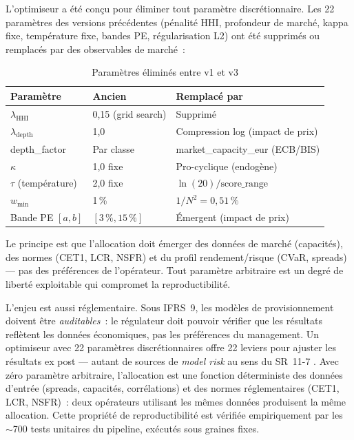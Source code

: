 \documentclass[10pt, a4paper, oneside]{report}
\theoremstyle{definition}
\begin{document}
L'optimiseur a été conçu pour éliminer tout paramètre discrétionnaire. Les 22 paramètres des versions précédentes (pénalité HHI, profondeur de marché, kappa fixe, température fixe, bandes PE, régularisation L2) ont été supprimés ou remplacés par des observables de marché~:

\begin{table}[htbp]
\centering
\caption{Paramètres éliminés entre v1 et v3}
\label{tab:zero-params}
\small
\begin{tabular}{lll}
\toprule
Paramètre & Ancien & Remplacé par \\
\midrule
$\lambda_{\text{HHI}}$ & 0{,}15 (grid search) & Supprimé \\
$\lambda_{\text{depth}}$ & 1{,}0 & Compression log (impact de prix) \\
depth\_factor & Par classe & market\_capacity\_eur (ECB/BIS) \\
$\kappa$ & 1{,}0 fixe & Pro-cyclique (endogène) \\
$\tau$ (température) & 2{,}0 fixe & $\ln(20) / \text{score\_range}$ \\
$w_{\min}$ & 1\,\% & $1/N^2 = 0{,}51\,\%$ \\
Bande PE $[a, b]$ & $[3\,\%, 15\,\%]$ & Émergent (impact de prix) \\
\bottomrule
\end{tabular}
\end{table}

Le principe est que l'allocation doit émerger des données de marché (capacités), des normes (CET1, LCR, NSFR) et du profil rendement/risque (CVaR, spreads) --- pas des préférences de l'opérateur. Tout paramètre arbitraire est un degré de liberté exploitable qui compromet la reproductibilité.

L'enjeu est aussi réglementaire. Sous IFRS~9, les modèles de provisionnement doivent être \emph{auditables}~: le régulateur doit pouvoir vérifier que les résultats reflètent les données économiques, pas les préférences du management. Un optimiseur avec 22 paramètres discrétionnaires offre 22 leviers pour ajuster les résultats ex post --- autant de sources de \emph{model risk} au sens du SR~11-7 \citep{eba_st_2023}. Avec zéro paramètre arbitraire, l'allocation est une fonction déterministe des données d'entrée (spreads, capacités, corrélations) et des normes réglementaires (CET1, LCR, NSFR)~: deux opérateurs utilisant les mêmes données produisent la même allocation. Cette propriété de reproductibilité est vérifiée empiriquement par les $\sim$700 tests unitaires du pipeline, exécutés sous graines fixes.
\end{document}
